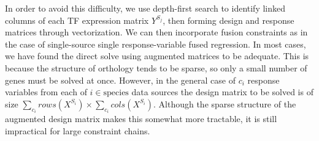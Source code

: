 \documentclass[11pt]{article}
\begin{document}
In order to avoid this difficulty, we use depth-first search to identify linked columns of each TF expression matrix $Y^{S_j}$, then forming design and response matrices through vectorization. We can then incorporate fusion constraints as in the case of single-source single response-variable fused regression. In most cases, we have found the direct solve using augmented matrices to be adequate. This is because the structure of orthology tends to be sparse, so only a small number of genes must be solved at once. However, in the general case of $c_i$ response variables from each of $i \in \text{species}$ data sources the design matrix to be solved is of size $\displaystyle \sum_{c_i} rows(X^{S_i}) \times \displaystyle \sum_{c_i} cols(X^{S_i})$. Although the sparse structure of the augmented design matrix makes this somewhat more tractable, it is still impractical for large constraint chains.



\end{document}
